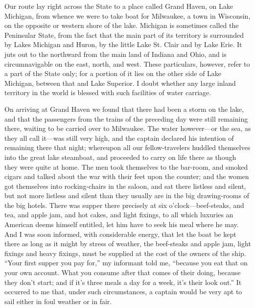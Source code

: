 Our route lay right across the State to a place called Grand Haven,
on Lake Michigan, from whence we were to take boat for Milwaukee, a
town in Wisconsin, on the opposite or western shore of the lake.
Michigan is sometimes called the Peninsular State, from the fact
that the main part of its territory is surrounded by Lakes Michigan
and Huron, by the little Lake St. Clair and by Lake Erie.  It juts
out to the northward from the main land of Indiana and Ohio, and is
circumnavigable on the east, north, and west.  These particulars,
however, refer to a part of the State only; for a portion of it
lies on the other side of Lake Michigan, between that and Lake
Superior.  I doubt whether any large inland territory in the world
is blessed with such facilities of water carriage.

On arriving at Grand Haven we found that there had been a storm on
the lake, and that the passengers from the trains of the preceding
day were still remaining there, waiting to be carried over to
Milwaukee.  The water however---or the sea, as they all call it---was
still very high, and the captain declared his intention of
remaining there that night; whereupon all our fellow-travelers
huddled themselves into the great lake steamboat, and proceeded to
carry on life there as though they were quite at home.  The men
took themselves to the bar-room, and smoked cigars and talked about
the war with their feet upon the counter; and the women got
themselves into rocking-chairs in the saloon, and sat there
listless and silent, but not more listless and silent than they
usually are in the big drawing-rooms of the big hotels.  There was
supper there precisely at six o'clock---beef-steaks, and tea, and
apple jam, and hot cakes, and light fixings, to all which luxuries
an American deems himself entitled, let him have to seek his meal
where he may.  And I was soon informed, with considerable energy,
that let the boat be kept there as long as it might by stress of
weather, the beef-steaks and apple jam, light fixings and heavy
fixings, must be supplied at the cost of the owners of the ship.
``Your first supper you pay for,'' my informant told me, ``because you
eat that on your own account.  What you consume after that comes of
their doing, because they don't start; and if it's three meals a
day for a week, it's their look out.''  It occurred to me that,
under such circumstances, a captain would be very apt to sail
either in foul weather or in fair.

